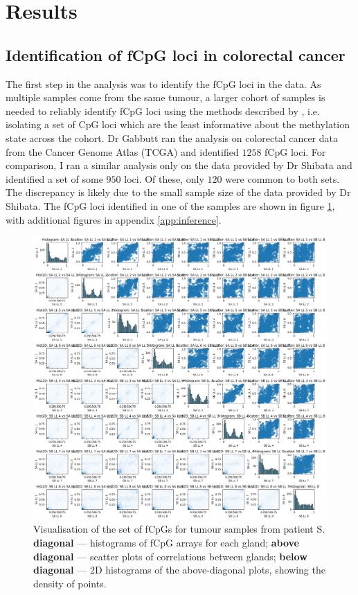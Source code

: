 \section{Results}
\subsection{Identification of fCpG loci in colorectal cancer}
The first step in the analysis was to identify the fCpG loci in the data. As
multiple samples come from the same tumour, a larger cohort of samples is
needed to reliably identify fCpG loci using the methods described by
\cite{gabbutt_evolutionary_2023}, i.e. isolating a set of CpG loci which are
the least informative about the methylation state across the cohort. Dr Gabbutt
ran the analysis on colorectal cancer data from the Cancer Genome Atlas (TCGA)
and identified $1258$ fCpG loci. For comparison, I ran a similar analysis only
on the data provided by Dr Shibata and identified a set of some $950$ loci. Of
these, only $120$ were common to both sets. The discrepancy is likely due to
the small sample size of the data provided by Dr Shibata. The fCpG loci
identified in one of the samples are shown in figure \ref{fig:fCpG_loci_S},
with additional figures in appendix \ref{app:inference}.

\begin{figure}[h]
    \centering
    \includegraphics[width=\textwidth]{Chapter_5/figures/fCpG_loci_S.png}
    \caption{Visualisation of the set of fCpGs for tumour samples from patient
    S. \textbf{diagonal} --- histograms of fCpG arrays for each gland;
    \textbf{above diagonal} --- scatter plots of correlations between glands;
    \textbf{below diagonal} --- $2$D histograms of the above-diagonal plots,
    showing the density of points.}
    \label{fig:fCpG_loci_S}
\end{figure}



